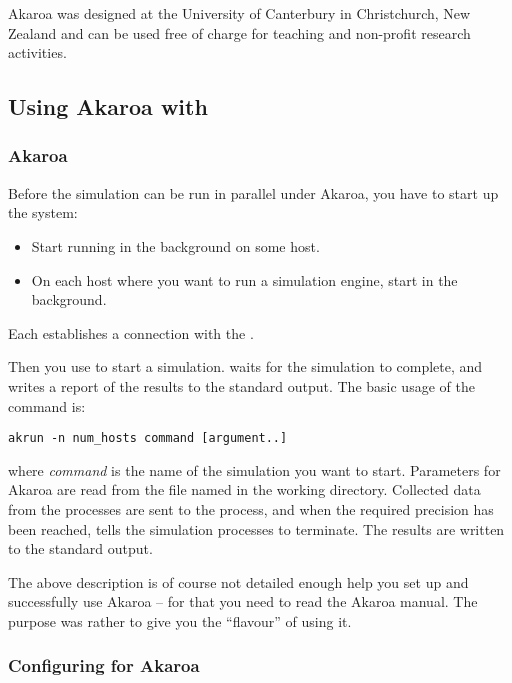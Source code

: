 Akaroa was designed at the University of Canterbury in Christchurch, New Zealand
and can be used free of charge for teaching and non-profit research activities.


\subsection{Using Akaroa with {\opp}}

\subsubsection{Akaroa}

Before the simulation can be run in parallel under Akaroa, you have to
start up the system:

\begin{itemize}
  \item{Start  running in the background on some host.}
  \item{On each host where you want to run a simulation engine,
     start  in the background.}
\end{itemize}

Each  establishes a connection with the .

Then you use  to start a simulation.  waits
for the simulation to complete, and writes a report of the results
to the standard output. The basic usage of the  command is:

\begin{verbatim}
akrun -n num_hosts command [argument..]
\end{verbatim}

where \textit{command} is the name of the simulation you want to start.
Parameters for Akaroa are read from the file named  in
the working directory. Collected data from the processes are
sent to the  process, and when the required precision
has been reached,  tells the simulation processes to
terminate. The results are written to the standard output.

The above description is of course not detailed enough help you
set up and successfully use Akaroa -- for that you need to read the
Akaroa manual. The purpose was rather to give you the ``flavour''
of using it.

\subsubsection{Configuring {\opp} for Akaroa}

